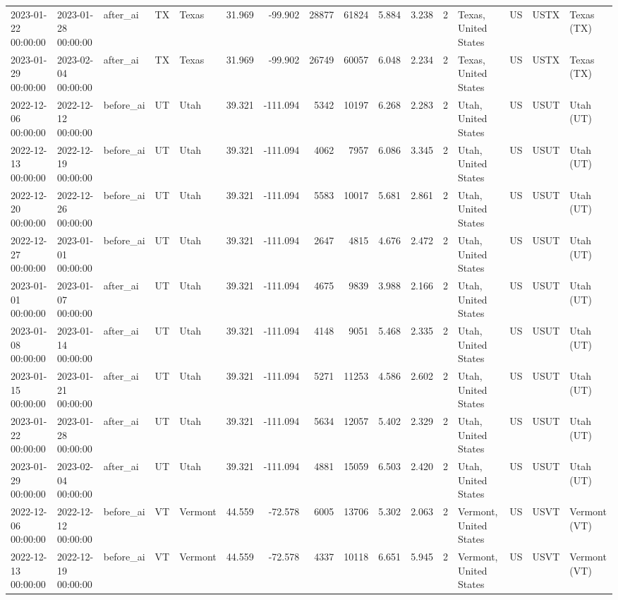 \begin{tabular}{lllllrrrrrrlllll}
2023-01-22 00:00:00 & 2023-01-28 00:00:00 & after\_ai & TX & Texas & 31.969 & -99.902 & 28877 & 61824 & 5.884 & 3.238 & 2 & Texas, United States & US & USTX & Texas (TX) \\
2023-01-29 00:00:00 & 2023-02-04 00:00:00 & after\_ai & TX & Texas & 31.969 & -99.902 & 26749 & 60057 & 6.048 & 2.234 & 2 & Texas, United States & US & USTX & Texas (TX) \\
2022-12-06 00:00:00 & 2022-12-12 00:00:00 & before\_ai & UT & Utah & 39.321 & -111.094 & 5342 & 10197 & 6.268 & 2.283 & 2 & Utah, United States & US & USUT & Utah (UT) \\
2022-12-13 00:00:00 & 2022-12-19 00:00:00 & before\_ai & UT & Utah & 39.321 & -111.094 & 4062 & 7957 & 6.086 & 3.345 & 2 & Utah, United States & US & USUT & Utah (UT) \\
2022-12-20 00:00:00 & 2022-12-26 00:00:00 & before\_ai & UT & Utah & 39.321 & -111.094 & 5583 & 10017 & 5.681 & 2.861 & 2 & Utah, United States & US & USUT & Utah (UT) \\
2022-12-27 00:00:00 & 2023-01-01 00:00:00 & before\_ai & UT & Utah & 39.321 & -111.094 & 2647 & 4815 & 4.676 & 2.472 & 2 & Utah, United States & US & USUT & Utah (UT) \\
2023-01-01 00:00:00 & 2023-01-07 00:00:00 & after\_ai & UT & Utah & 39.321 & -111.094 & 4675 & 9839 & 3.988 & 2.166 & 2 & Utah, United States & US & USUT & Utah (UT) \\
2023-01-08 00:00:00 & 2023-01-14 00:00:00 & after\_ai & UT & Utah & 39.321 & -111.094 & 4148 & 9051 & 5.468 & 2.335 & 2 & Utah, United States & US & USUT & Utah (UT) \\
2023-01-15 00:00:00 & 2023-01-21 00:00:00 & after\_ai & UT & Utah & 39.321 & -111.094 & 5271 & 11253 & 4.586 & 2.602 & 2 & Utah, United States & US & USUT & Utah (UT) \\
2023-01-22 00:00:00 & 2023-01-28 00:00:00 & after\_ai & UT & Utah & 39.321 & -111.094 & 5634 & 12057 & 5.402 & 2.329 & 2 & Utah, United States & US & USUT & Utah (UT) \\
2023-01-29 00:00:00 & 2023-02-04 00:00:00 & after\_ai & UT & Utah & 39.321 & -111.094 & 4881 & 15059 & 6.503 & 2.420 & 2 & Utah, United States & US & USUT & Utah (UT) \\
2022-12-06 00:00:00 & 2022-12-12 00:00:00 & before\_ai & VT & Vermont & 44.559 & -72.578 & 6005 & 13706 & 5.302 & 2.063 & 2 & Vermont, United States & US & USVT & Vermont (VT) \\
2022-12-13 00:00:00 & 2022-12-19 00:00:00 & before\_ai & VT & Vermont & 44.559 & -72.578 & 4337 & 10118 & 6.651 & 5.945 & 2 & Vermont, United States & US & USVT & Vermont (VT) \\

\end{tabular}
